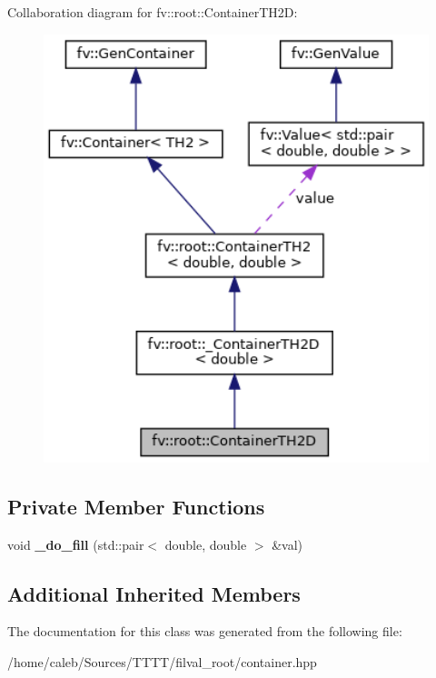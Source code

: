 Collaboration diagram for fv\+:\+:root\+:\+:Container\+T\+H2D\+:
\nopagebreak
\begin{figure}[H]
\begin{center}
\leavevmode
\includegraphics[width=342pt]{classfv_1_1root_1_1ContainerTH2D__coll__graph}
\end{center}
\end{figure}
\subsection*{Private Member Functions}
\begin{DoxyCompactItemize}
\item 
\hypertarget{classfv_1_1root_1_1ContainerTH2D_ac61ace3c44f5f371b69edc7394fba54f}{}\label{classfv_1_1root_1_1ContainerTH2D_ac61ace3c44f5f371b69edc7394fba54f} 
void {\bfseries \+\_\+do\+\_\+fill} (std\+::pair$<$ double, double $>$ \&val)
\end{DoxyCompactItemize}
\subsection*{Additional Inherited Members}


The documentation for this class was generated from the following file\+:\begin{DoxyCompactItemize}
\item 
/home/caleb/\+Sources/\+T\+T\+T\+T/filval\+\_\+root/container.\+hpp\end{DoxyCompactItemize}
